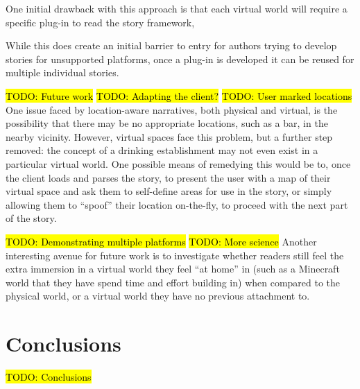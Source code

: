\documentclass{acm}
\newcommand{\TODO}[1]{\hl{TODO: #1}}
\begin{document}
One initial drawback with this approach is that each virtual world will require a specific plug-in to read the story framework, 

While this does create an initial barrier to entry for authors trying to develop stories for unsupported platforms, once a plug-in is developed it can be reused for multiple individual stories.

\TODO{Future work}
\TODO{Adapting the client?}
\TODO{User marked locations}
One issue faced by location-aware narratives, both physical and virtual, is the possibility that there may be no appropriate locations, such as a bar, in the nearby vicinity. However, virtual spaces face this problem, but a further step removed: the concept  of a drinking establishment may not even exist in a particular virtual world. One possible means of remedying this would be to, once the client loads and parses the story, to present the user with a map of their virtual space and ask them to self-define areas for use in the story, or simply allowing them to ``spoof'' their location on-the-fly, to proceed with the next part of the story.

\TODO{Demonstrating multiple platforms}
\TODO{More science}
Another interesting avenue for future work is to investigate whether readers still feel the extra immersion in a virtual world they feel ``at home'' in (such as a Minecraft world that they have spend time and effort building in) when compared to the physical world, or a virtual world they have no previous attachment to.

\section{Conclusions}
\TODO{Conclusions}



\end{document}
